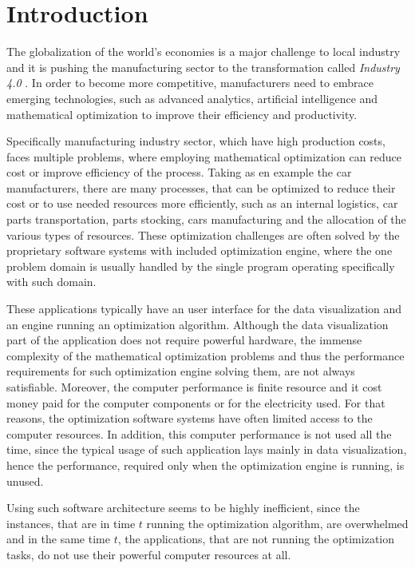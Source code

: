 \chapter{Introduction}\label{ch:introduction}
The globalization of the world’s economies is a major challenge to local industry 
and it is pushing the manufacturing sector to the transformation called \textit{Industry 4.0} \cite{industry40}.
In order to become more competitive, 
manufacturers need to embrace emerging technologies, 
such as advanced analytics, artificial intelligence 
and mathematical optimization to improve their efficiency and productivity.

Specifically manufacturing industry sector,
which have high production costs,
faces multiple problems,
where employing mathematical optimization can reduce cost or improve efficiency of the process.
Taking as en example the car manufacturers,
there are many processes,
that can be optimized to reduce their cost or to use needed resources more efficiently,
such as an internal logistics, car parts transportation, parts stocking, cars manufacturing 
and the allocation of the various types of resources.
These optimization challenges are often solved by the proprietary software systems with included optimization engine,
where the one problem domain is usually handled by the single program operating specifically with such domain.

These applications typically have an user interface for the data visualization
and an engine running an optimization algorithm.
Although the data visualization part of the application does not require powerful hardware,
the immense complexity of the mathematical optimization problems 
and thus the performance requirements for such optimization engine solving them, are not always satisfiable.
Moreover,
the computer performance is finite resource
and it cost money paid for the computer components or for the electricity used.
For that reasons,
the optimization software systems have often limited access to the computer resources.
In addition,
this computer performance is not used all the time,
since the typical usage of such application lays mainly in data visualization,
hence the performance, required only when the optimization engine is running, is unused.

Using such software architecture seems to be highly inefficient,
since the instances, that are in time $t$ running the optimization algorithm, are overwhelmed 
and in the same time $t$,
the applications, that are not running the optimization tasks,
do not use their powerful computer resources at all.

